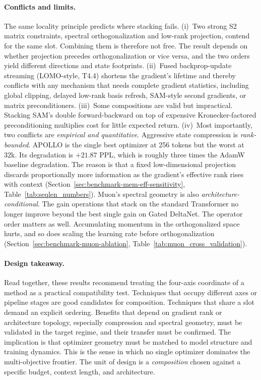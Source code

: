 \paragraph{Conflicts and limits.}
The same locality principle predicts where stacking fails. (i)~Two strong S2
matrix constraints, spectral orthogonalization and low-rank projection, contend
for the same slot. Combining them is therefore not free. The
result depends on whether projection precedes orthogonalization or vice versa,
and the two orders yield different directions and state footprints.
(ii)~Fused backprop-update streaming (LOMO-style, T4.4) shortens the gradient's
lifetime and thereby conflicts with
any mechanism that needs complete gradient statistics, including global
clipping, delayed low-rank basis refresh, SAM-style second gradients, or matrix
preconditioners.
(iii)~Some compositions are valid but impractical. Stacking SAM's double
forward-backward on top of expensive Kronecker-factored preconditioning multiplies cost
for little expected return. (iv)~Most importantly, two conflicts are
\emph{empirical and quantitative}. Aggressive state compression is
\emph{rank-bounded}. APOLLO is the single best optimizer at 256 tokens but the
worst at 32k. Its degradation is
$+21.87$ PPL, which is roughly three times the AdamW baseline degradation. The
reason is that a fixed low-dimensional projection discards proportionally more
information as the gradient's effective rank rises
with context (Section~\ref{sec:benchmark-mem-eff-sensitivity},
Table~\ref{tab:seqlen_numbers}). Muon's spectral geometry is also
\emph{architecture-conditional}. The gain
operations that stack on the standard Transformer no longer improve beyond the best single gain on Gated DeltaNet.
The operator order matters as well. Accumulating momentum in the
orthogonalized space hurts, and so does scaling the
learning rate before orthogonalization
(Section~\ref{sec:benchmark-muon-ablation},
Table~\ref{tab:muon_cross_validation}).

\paragraph{Design takeaway.}
Read together, these results recommend treating the four-axis coordinate of a
method as a practical compatibility test. Techniques that occupy different axes
or pipeline stages are good candidates for composition. Techniques that share a
slot demand an explicit ordering. Benefits that depend on gradient rank or
architecture topology, especially compression and spectral geometry, must be
validated in the target regime, and their transfer must be confirmed.
The implication is that optimizer geometry must be matched to model structure
and training dynamics. This is the sense in which no single optimizer dominates
the multi-objective frontier. The unit of design is a \emph{composition} chosen
against a specific budget, context length, and architecture.

